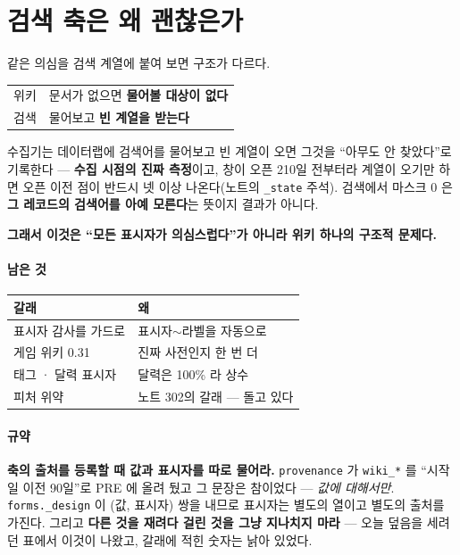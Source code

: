 \documentclass[10pt]{article}
\begin{document}
\section{검색 축은 왜 괜찮은가}

같은 의심을 검색 계열에 붙여 보면 구조가 다르다.

\begin{center}\footnotesize
\begin{tabular}{ll}
\hline
위키 & 문서가 없으면 \textbf{물어볼 대상이 없다} \\
검색 & 물어보고 \textbf{빈 계열을 받는다} \\
\hline
\end{tabular}
\end{center}

수집기는 데이터랩에 검색어를 물어보고 빈 계열이 오면 그것을 ``아무도 안
찾았다''로 기록한다 --- \textbf{수집 시점의 진짜 측정}이고, 창이 오픈 210일
전부터라 계열이 오기만 하면 오픈 이전 점이 반드시 넷 이상 나온다(노트의
\texttt{\_state} 주석). 검색에서 마스크 0 은 \textbf{그 레코드의 검색어를
아예 모른다}는 뜻이지 결과가 아니다.

\textbf{그래서 이것은 ``모든 표시자가 의심스럽다''가 아니라 위키 하나의
구조적 문제다.}

\paragraph{남은 것}
\begin{center}\small
\begin{tabular}{ll}
\hline
갈래 & 왜 \\
\hline
표시자 감사를 가드로 & 표시자$\sim$라벨을 자동으로 \\
게임 위키 0.31 & 진짜 사전인지 한 번 더 \\
태그 · 달력 표시자 & 달력은 100\% 라 상수 \\
피처 위약 & 노트 302의 갈래 --- 돌고 있다 \\
\hline
\end{tabular}
\end{center}

\paragraph{규약} \textbf{축의 출처를 등록할 때 값과 표시자를 따로 물어라.}
\texttt{provenance} 가 \texttt{wiki\_*} 를 ``시작일 이전 90일''로 PRE 에
올려 뒀고 그 문장은 참이었다 --- \emph{값에 대해서만}. \texttt{forms.\_design}
이 (값, 표시자) 쌍을 내므로 표시자는 별도의 열이고 별도의 출처를 가진다.
그리고 \textbf{다른 것을 재려다 걸린 것을 그냥 지나치지 마라} --- 오늘
덮음을 세려던 표에서 이것이 나왔고, 갈래에 적힌 숫자는 낡아 있었다.
\end{document}
